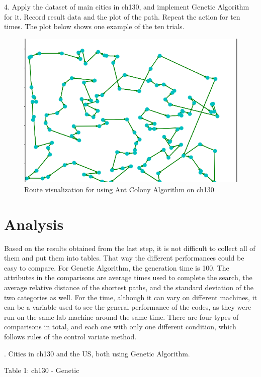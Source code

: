 \documentclass{article}
\begin{document}
4. Apply the dataset of main cities in ch130, and implement Genetic Algorithm for it. Record result data and the plot of the path. Repeat the action for ten times. The plot below shows one example of the ten trials.  

\bigskip
\begin{figure}[h]
  \begin{center}
    \includegraphics[scale=0.49]{image3}
  \end{center}
  \caption{Route visualization for using Ant Colony Algorithm on ch130}
\end{figure}
\bigskip


\section{Analysis}
Based on the results obtained from the last step, it is not difficult to collect all of them and put them into tables. That way the different performances could be easy to compare. For Genetic Algorithm, the generation time is 100. The attributes in the comparisons are average times used to complete the search, the average relative distance of the shortest paths, and the standard deviation of the two categories as well. For the time, although it can vary on different machines, it can be a variable used to see the general performance of the codes, as they were run on the same lab machine around the same time. There are four types of comparisons in total, and each one with only one different condition, which follows rules of the control variate method. 

. Cities in ch130 and the US, both using Genetic Algorithm. 

\begin{center}
    Table 1: ch130 - Genetic
\end{center}
\end{document}
